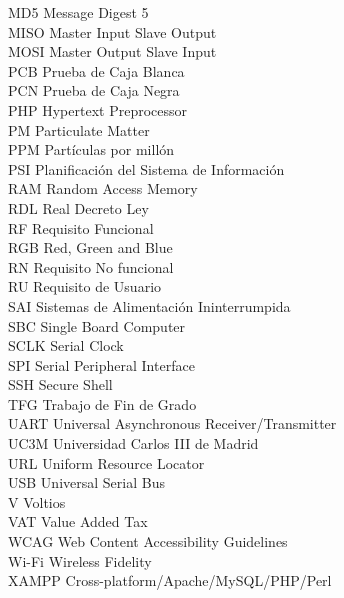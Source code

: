 \begin{tabbing}
	MD5 \> Message Digest 5 \\
	MISO \> Master Input Slave Output \\
	MOSI \> Master Output Slave Input \\
	PCB \> Prueba de Caja Blanca \\
	PCN \> Prueba de Caja Negra \\
	PHP \> Hypertext Preprocessor \\
	PM \> Particulate Matter \\
	PPM \> Partículas por millón \\
	PSI \> Planificación del Sistema de Información \\
	RAM \> Random Access Memory \\
	RDL \> Real Decreto Ley \\
	RF \> Requisito Funcional \\
	RGB \> Red, Green and Blue \\
	RN \> Requisito No funcional \\
	RU \> Requisito de Usuario \\
	SAI \> Sistemas de Alimentación Ininterrumpida \\
	SBC \> Single Board Computer \\
	SCLK \> Serial Clock \\
	SPI \> Serial Peripheral Interface \\
	SSH \> Secure Shell \\
	TFG \> Trabajo de Fin de Grado \\
	UART \> Universal Asynchronous Receiver/Transmitter \\
	UC3M \> Universidad Carlos III de Madrid \\
	URL \> Uniform Resource Locator \\
	USB \> Universal Serial Bus \\
	V \> Voltios \\
	VAT \> Value Added Tax \\
	WCAG \> Web Content Accessibility Guidelines \\
	Wi-Fi \> Wireless Fidelity \\
	XAMPP \> Cross-platform/Apache/MySQL/PHP/Perl
\end{tabbing}

\newpage %
\thispagestyle{empty}
\mbox{}